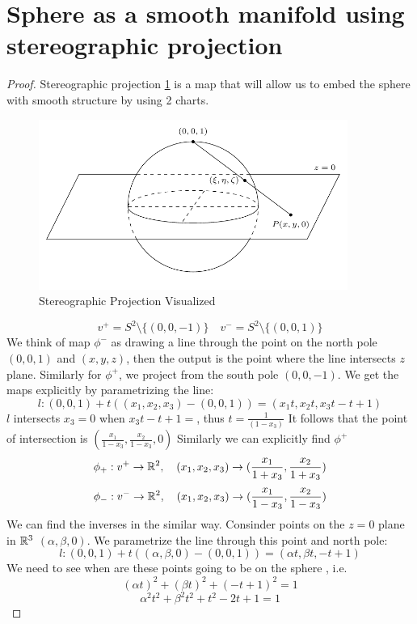 \documentclass[11pt,a4paper]{report}
\begin{document}
\section{Sphere as a smooth manifold using stereographic projection}
\begin{proof}
Stereographic projection \ref{ster_proj} is a map that will allow us to embed the sphere with smooth structure by using 2 charts.
\newline
\begin{figure}[h] \label{ster_proj}
    \centering
    \includegraphics[width=0.90\textwidth]{stereographic_projection.png}
    \caption{Stereographic Projection Visualized}
\end{figure}
$$ v^{+} = S^2 \setminus \{(0,0,-1)\} \quad v^{-} = S^2 \setminus \{ (0,0,1) \} $$
We think of map $\phi^{-}$ as drawing a line through the point on the north pole $(0,0,1)$ and $(x,y,z)$, then the output is the point where the line intersects $z$ plane.
Similarly for $\phi^{+}$, we project from the south pole $(0,0,-1)$. We get the maps explicitly by parametrizing the line:
$$ l: (0,0,1) + t ((x_1,x_2,x_3) - (0,0,1)) =  (x_1 t,x_2 t, x_3 t-t+1) $$
$l$ intersects $x_3=0$ when $x_3t-t+1=$, thus $t = \frac{1}{(1-x_3)}$ It follows that the point of intersection is $(\frac{x_1}{1-x_3},\frac{x_2}{1-x_3},0)$
Similarly we can explicitly find $\phi^{+}$
$$ \phi_{+}: v^{+} \to \mathbb{R}^2, \quad (x_1,x_2,x_3) \to (\frac{x_1}{1+x_3}, \frac{x_2}{1+x_3} )$$
$$ \phi_{-}: v^{-} \to \mathbb{R}^2, \quad (x_1,x_2,x_3) \to (\frac{x_1}{1-x_3}, \frac{x_2}{1-x_3} )$$
We can find the inverses in the similar way.
Consinder points on the $z=0$ plane in $\mathbb{R}^3$ $(\alpha, \beta, 0)$. We parametrize the line through this point and north pole:
$$ l: (0,0,1) + t((\alpha, \beta, 0 ) - (0,0,1)) = (\alpha t, \beta t, -t +1)$$
We need to see when are these points going to be on the sphere , i.e.
$$ (\alpha t)^2  + (\beta t)^2 + (-t +1)^2 = 1 $$
$$ \alpha^2 t^2 + \beta^2 t^2 + t^2 - 2t + 1 = 1 $$

\end{proof}
\end{document}
